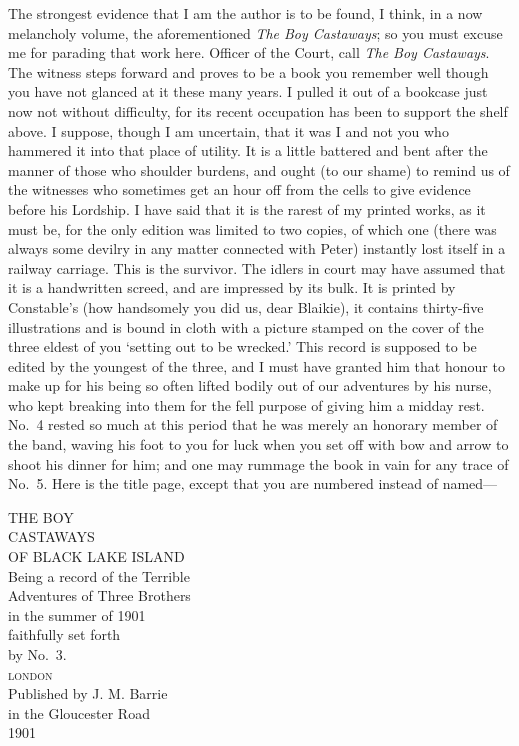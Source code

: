 The strongest evidence that I am the author is to be found, I think,
in a now melancholy volume, the aforementioned \emph{The Boy Castaways};
so you must excuse me for parading that work here.
Officer of the Court, call \emph{The Boy Castaways}.
The witness steps forward and proves to be a book you remember well
though you have not glanced at it these many years.
I pulled it out of a bookcase just now not without difficulty,
for its recent occupation has been to support the shelf above.
I suppose, though I am uncertain,
that it was I and not you who hammered it into that place of utility.
It is a little battered and bent after the manner of those who shoulder burdens,
and ought (to our shame) to remind us of the witnesses
who sometimes get an hour off from the cells to give evidence before his Lordship.
I have said that it is the rarest of my printed works, as it must be,
for the only edition was limited to two copies, of which one
(there was always some devilry in any matter connected with Peter)
instantly lost itself in a railway carriage.
This is the survivor.
The idlers in court may have assumed that it is a handwritten screed, and are impressed by its bulk.
It is printed by Constable’s
(how handsomely you did us, dear Blaikie),
it contains thirty‐five illustrations
and is bound in cloth with a picture stamped on the cover
of the three eldest of you ‘setting out to be wrecked.’
This record is supposed to be edited by the youngest of the three,
and I must have granted him that honour
to make up for his being so often lifted bodily out of our adventures by his nurse,
who kept breaking into them for the fell purpose of giving him a midday rest.
No.~4 rested so much at this period that he was merely an honorary member of the band,
waving his foot to you for luck when you set off with bow and arrow to shoot his dinner for him;
and one may rummage the book in vain for any trace of No.~5.
Here is the title page, except that you are numbered instead of named—

\begin{minipage}{\textwidth}
\begin{center}
	\uppercase{The Boy\\[0.25\baselineskip]%
		Castaways\\[0.25\baselineskip]%
		of Black Lake Island\\[0.25\baselineskip]}
	Being a record of the Terrible\\
	Adventures of Three Brothers\\
	in the summer of 1901\\
	faithfully set forth\\by No.~3.\\[\baselineskip]
	\textsc{\lowercase{London}}\\
	Published by J. M. Barrie\\
	in the Gloucester Road\\
	1901
\end{center}
\end{minipage}

